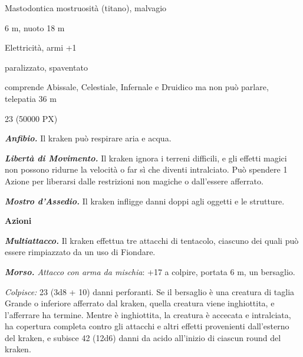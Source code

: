 \begin{multicols}{2}
{%

\begin{description}[noitemsep, topsep=0pt, parsep=0pt, partopsep=0pt, itemsep=1pt, leftmargin=2.35cm,  labelwidth=2.2cm, itemindent=0cm, listparindent=0pt] %
\setlength{\baselineskip}{10pt}
\item[\textbf{Taglia/Tipo}] Mastodontica mostruosità (titano), malvagio
\item[\textbf{Caratt.}] 
\item[\textbf{Punti Ferita}] 
\item[\textbf{Movimento}] 6 m, nuoto 18 m
\item[\textbf{Tiri Salvez.}] 
\item[\textbf{Imm. Danni}] Elettricità, armi +1
\item[\textbf{Immunità}] paralizzato, spaventato
\item[\textbf{Sensi}] 
\item[\textbf{Linguaggi}] comprende Abissale, Celestiale, Infernale e Druidico ma non può parlare, telepatia 36 m
\item[\textbf{Sfida}] 23 (50000 PX)
\end{description}
\smallskip

\emph{\textbf{Anfibio.}} Il kraken può respirare aria e acqua.

\emph{\textbf{Libertà di Movimento.}} Il kraken ignora i terreni difficili, e gli effetti magici non possono ridurne la velocità o far sì che diventi intralciato. Può spendere 1 Azione per liberarsi dalle restrizioni non magiche o dall'essere afferrato.

\emph{\textbf{Mostro d'Assedio.}} Il kraken infligge danni doppi agli oggetti e le strutture.

\textbf{Azioni}

\emph{\textbf{Multiattacco.}} Il kraken effettua tre attacchi di tentacolo, ciascuno dei quali può essere rimpiazzato da un uso di Fiondare.

\emph{\textbf{Morso.} Attacco con arma da mischia}: +17 a colpire, portata 6 m, un bersaglio.

\emph{Colpisce:} 23 (3d8 + 10) danni perforanti. Se il bersaglio è una creatura di taglia Grande o inferiore afferrato dal kraken, quella creatura viene inghiottita, e l'afferrare ha termine. Mentre è inghiottita, la creatura è accecata e intralciata, ha copertura completa contro gli attacchi e altri effetti provenienti dall'esterno del kraken, e subisce 42 (12d6) danni da acido all'inizio di ciascun round del kraken.

}
\end{multicols}
